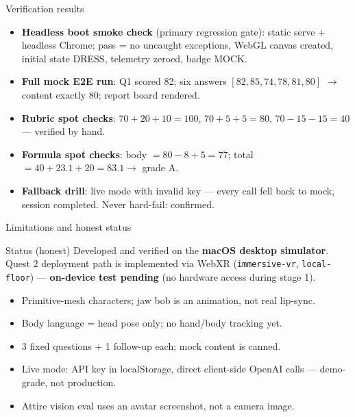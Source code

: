\documentclass{beamer}
\begin{document}
\begin{frame}{Verification results}
  \begin{itemize}\small
    \item \textbf{Headless boot smoke check} (primary regression gate): static serve + headless Chrome; pass = no uncaught exceptions, WebGL canvas created, initial state DRESS, telemetry zeroed, badge MOCK.
    \item \textbf{Full mock E2E run}: Q1 scored 82; six answers \([82,85,74,78,81,80]\) \(\to\) content exactly 80; report board rendered.
    \item \textbf{Rubric spot checks}: \(70{+}20{+}10{=}100\), \(70{+}5{+}5{=}80\), \(70{-}15{-}15{=}40\) --- verified by hand.
    \item \textbf{Formula spot checks}: body \(=80-8+5=77\); total \(=40+23.1+20=83.1\to\) grade A.
    \item \textbf{Fallback drill}: live mode with invalid key --- every call fell back to mock, session completed. Never hard-fail: confirmed.
  \end{itemize}
\end{frame}

\begin{frame}{Limitations and honest status}
  \begin{alertblock}{Status (honest)}
    Developed and verified on the \textbf{macOS desktop simulator}. Quest 2 deployment path is implemented via WebXR (\texttt{immersive-vr}, \texttt{local-floor}) --- \textbf{on-device test pending} (no hardware access during stage 1).
  \end{alertblock}
  \begin{itemize}\small
    \item Primitive-mesh characters; jaw bob is an animation, not real lip-sync.
    \item Body language = head pose only; no hand/body tracking yet.
    \item 3 fixed questions + 1 follow-up each; mock content is canned.
    \item Live mode: API key in localStorage, direct client-side OpenAI calls --- demo-grade, not production.
    \item Attire vision eval uses an avatar screenshot, not a camera image.
  \end{itemize}
\end{frame}
\end{document}
